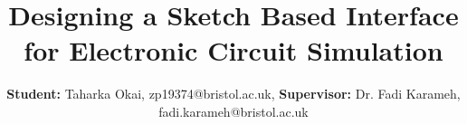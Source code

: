 


\usepackage[T1]{fontenc}
\usepackage{lmodern}
\usepackage[size=a1,scale=1.1]{beamerposter}


\usepackage{graphicx}
\usepackage{booktabs}
\usepackage{tikz}
\usepackage{pgfplots}
\pgfplotsset{compat=1.17}
\usepackage{multicol}
\usepackage{caption}
\usepackage{subcaption}
\captionsetup{font=normalsize}

\newcommand{\ncols}{3}
\newlength{\sepwidth}
\newlength{\colwidth}
\newlength{\midspace}
\setlength{\sepwidth}{0.020\paperwidth}
\setlength{\colwidth}{
{\dimexpr \paperwidth / \ncols \relax} -
{\dimexpr \sepwidth + \sepwidth / \ncols \relax}
}
\setlength{\midspace}{20ex}

\newcommand{\separatorcolumn}{\begin{column}{\sepwidth}\end{column}}


\title{Designing a Sketch Based Interface for Electronic Circuit Simulation}

\author{
  \textbf{Student:} Taharka Okai, zp19374@bristol.ac.uk,
  \textbf{Supervisor:} Dr. Fadi Karameh, fadi.karameh@bristol.ac.uk
}

\date{}


